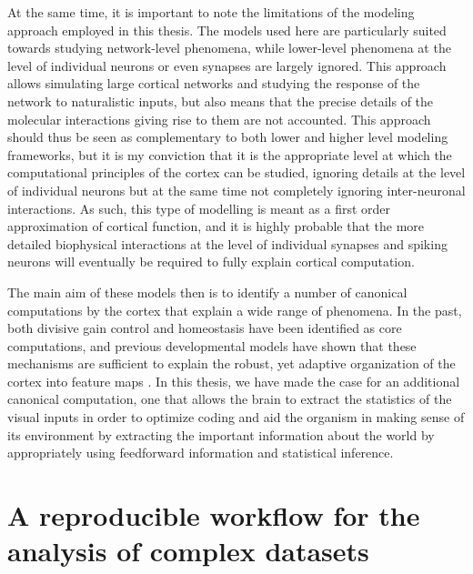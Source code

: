 At the same time, it is important to note the limitations of the
modeling approach employed in this thesis. The models used here are
particularly suited towards studying network-level phenomena, while
lower-level phenomena at the level of individual neurons or even
synapses are largely ignored. This approach allows simulating large
cortical networks and studying the response of the network to
naturalistic inputs, but also means that the precise details of the
molecular interactions giving rise to them are not accounted. This
approach should thus be seen as complementary to both lower and higher
level modeling frameworks, but it is my conviction that it is the
appropriate level at which the computational principles of the cortex
can be studied, ignoring details at the level of individual neurons
but at the same time not completely ignoring inter-neuronal
interactions. As such, this type of modelling is meant as a first
order approximation of cortical function, and it is highly probable
that the more detailed biophysical interactions at the level of
individual synapses and spiking neurons will eventually be required to
fully explain cortical computation.

The main aim of these models then is to identify a number of canonical
computations by the cortex that explain a wide range of phenomena. In
the past, both divisive gain control \citep{Carandini2012} and
homeostasis \citep{Marder2006} have been identified as core
computations, and previous developmental models have shown that these
mechanisms are sufficient to explain the robust, yet adaptive
organization of the cortex into feature maps \citep{Stevens2013}. In
this thesis, we have made the case for an additional canonical
computation, one that allows the brain to extract the statistics of the
visual inputs in order to optimize coding and aid the organism in making
sense of its environment by extracting the important information about
the world by appropriately using feedforward information and
statistical inference.

\section{A reproducible workflow for the analysis of complex datasets}

